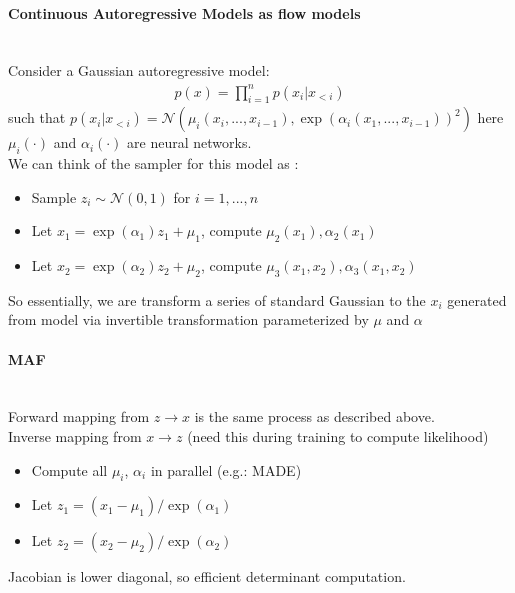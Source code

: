 \paragraph{Continuous Autoregressive Models as flow models}\mbox{}\\
Consider a Gaussian autoregressive model: 
    \begin{align*}
        p(x) = \prod_{i=1}^n p(x_i|x_{<i})
    \end{align*}
such that $p(x_i|x_{<i}) = \mathcal{N}(\mu_i(x_i, ..., x_{i-1}), \exp(\alpha_i(x_1, ..., x_{i-1}))^2)$ here $\mu_i(\cdot)$ and $\alpha_i(\cdot)$ are neural networks. \\
We can think of the sampler for this model as : 
    \begin{itemize}
        \item Sample $z_i \sim \mathcal{N}(0,1)$ for $i=1,...,n$
        \item Let $x_1 = \exp(\alpha_1)z_1 + \mu_1$, compute $\mu_2(x_1), \alpha_2(x_1)$
        \item Let $x_2 = \exp(\alpha_2)z_2 + \mu_2$, compute $\mu_3(x_1, x_2), \alpha_3(x_1, x_2)$
    \end{itemize}
So essentially, we are transform a series of standard Gaussian to the $x_i$ generated from model via invertible transformation parameterized by $\mu$ and $\alpha$

\paragraph{MAF}\mbox{}\\
Forward mapping from $z \to x$ is the same process as described above. \\
Inverse mapping from $x \to z$ (need this during training to compute likelihood) 
    \begin{itemize}
        \item Compute all $\mu_i$, $\alpha_i$ in parallel (e.g.: MADE)
        \item Let $z_1 = (x_1 - \mu_1) / \exp(\alpha_1)$
        \item Let $z_2 = (x_2 - \mu_2) / \exp(\alpha_2)$
    \end{itemize}
Jacobian is lower diagonal, so efficient determinant computation. 

